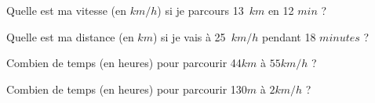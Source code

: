 \begin{multicols}{2}
    
    Quelle est ma vitesse (en $km/h$) si je parcours 13~$km$ en 12 $min$ ?

    
    Quelle est ma distance (en $km$) si je vais à 25~$km/h$ pendant 18 $minutes$ ?

\end{multicols}

\begin{multicols}{2}
    
    Combien de temps (en heures) pour parcourir 44$km$ à $55km/h$ ?

    
    Combien de temps (en heures) pour parcourir 130$m$ à $2km/h$ ? 

\end{multicols}